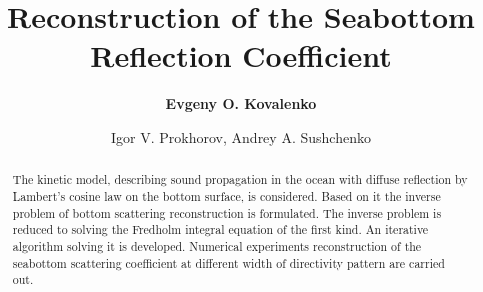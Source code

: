 \documentclass{procDDs}
\title{Reconstruction of the Seabottom Reflection Coefficient}
\author{\textbf{Evgeny O. Kovalenko}}%
{Far Eastern Federal University, Vladivostok, Russia}                 %
{kovalenko.eo@dvfu.ru}                                   %
\author{Igor V. Prokhorov, Andrey A. Sushchenko}%
{Institute for Applied Mathematics, FEB RAS, Vladivostok, Russia, \\ 
	Far Eastern Federal University, Vladivostok, Russia}                 %
{prokhorov@iam.dvo.ru, sushchenko.aa@dvfu.ru}                                   %
\begin{document}
\maketitle

%
\def\k{\mathbf{k}}
\def\n{\mathbf{n}}
\def\x{\mathbf{x}}
\def\y{\mathbf{y}}
\def\r{\mathbf{r}}
\def\p{\mathbf{|}}
\def\z{\mathbf{z}}
\def\V{\mathbf{V}}
\def\Vt{\mathbf{V}t}
\def\exp{\text{exp}}

\begin{abstract}
	The kinetic model, describing sound propagation in the ocean with diffuse reflection by Lambert's cosine law on the bottom surface, is considered. Based on it the inverse problem of bottom scattering reconstruction is formulated.
	The inverse problem is reduced to solving the Fredholm integral equation of the first kind. An iterative algorithm solving it is developed. Numerical experiments reconstruction of the seabottom scattering coefficient at different width of directivity pattern are carried out.
\end{abstract}
\end{document}
